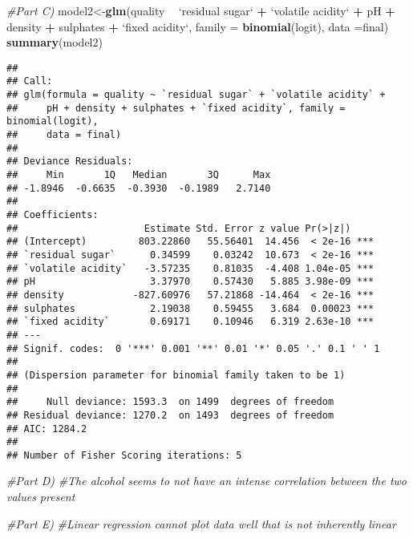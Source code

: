 \documentclass[
]{article}
\newenvironment{Shaded}{\begin{snugshade}}{\end{snugshade}}
\newcommand{\CommentTok}[1]{\textcolor[rgb]{0.56,0.35,0.01}{\textit{#1}}}
\newcommand{\DataTypeTok}[1]{\textcolor[rgb]{0.13,0.29,0.53}{#1}}
\newcommand{\KeywordTok}[1]{\textcolor[rgb]{0.13,0.29,0.53}{\textbf{#1}}}
\newcommand{\NormalTok}[1]{#1}
\newcommand{\OperatorTok}[1]{\textcolor[rgb]{0.81,0.36,0.00}{\textbf{#1}}}
\newcommand{\StringTok}[1]{\textcolor[rgb]{0.31,0.60,0.02}{#1}}
\begin{document}
\begin{Shaded}
\begin{Highlighting}[]
\CommentTok{#Part C)}
\NormalTok{model2<-}\KeywordTok{glm}\NormalTok{(quality }\OperatorTok{~}\StringTok{ `}\DataTypeTok{residual sugar}\StringTok{`} \OperatorTok{+}\StringTok{ `}\DataTypeTok{volatile acidity}\StringTok{`} \OperatorTok{+}\StringTok{ }\NormalTok{pH }\OperatorTok{+}\StringTok{ }\NormalTok{density }\OperatorTok{+}\StringTok{ }\NormalTok{sulphates }\OperatorTok{+}\StringTok{ `}\DataTypeTok{fixed acidity}\StringTok{`}\NormalTok{, }\DataTypeTok{family =} \KeywordTok{binomial}\NormalTok{(logit), }\DataTypeTok{data =}\NormalTok{final)}
\KeywordTok{summary}\NormalTok{(model2)}
\end{Highlighting}
\end{Shaded}

\begin{verbatim}
## 
## Call:
## glm(formula = quality ~ `residual sugar` + `volatile acidity` + 
##     pH + density + sulphates + `fixed acidity`, family = binomial(logit), 
##     data = final)
## 
## Deviance Residuals: 
##     Min       1Q   Median       3Q      Max  
## -1.8946  -0.6635  -0.3930  -0.1989   2.7140  
## 
## Coefficients:
##                      Estimate Std. Error z value Pr(>|z|)    
## (Intercept)         803.22860   55.56401  14.456  < 2e-16 ***
## `residual sugar`      0.34599    0.03242  10.673  < 2e-16 ***
## `volatile acidity`   -3.57235    0.81035  -4.408 1.04e-05 ***
## pH                    3.37970    0.57430   5.885 3.98e-09 ***
## density            -827.60976   57.21868 -14.464  < 2e-16 ***
## sulphates             2.19038    0.59455   3.684  0.00023 ***
## `fixed acidity`       0.69171    0.10946   6.319 2.63e-10 ***
## ---
## Signif. codes:  0 '***' 0.001 '**' 0.01 '*' 0.05 '.' 0.1 ' ' 1
## 
## (Dispersion parameter for binomial family taken to be 1)
## 
##     Null deviance: 1593.3  on 1499  degrees of freedom
## Residual deviance: 1270.2  on 1493  degrees of freedom
## AIC: 1284.2
## 
## Number of Fisher Scoring iterations: 5
\end{verbatim}

\begin{Shaded}
\begin{Highlighting}[]
\CommentTok{#Part D)}
\CommentTok{#The alcohol seems to not have an intense correlation between the two values present}

\CommentTok{#Part E)}
\CommentTok{#Linear regression cannot plot data well that is not inherently linear}
\end{Highlighting}
\end{Shaded}
\end{document}

